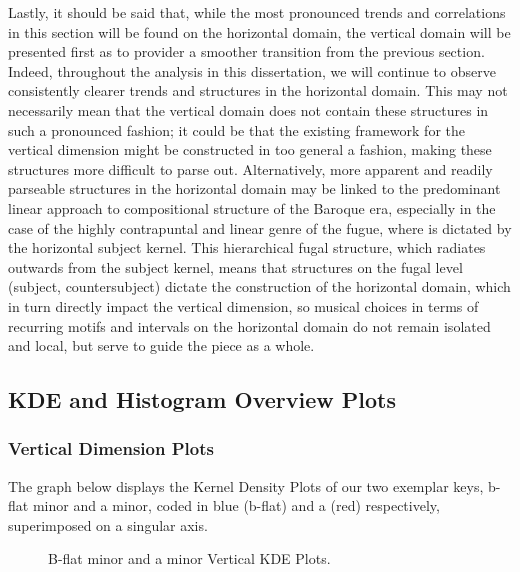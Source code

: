 Lastly, it should be said that, while the most pronounced trends and
correlations in this section will be found on the horizontal domain, the
vertical domain will be presented first as to provider a smoother
transition from the previous section. Indeed, throughout the analysis in
this dissertation, we will continue to observe consistently clearer
trends and structures in the horizontal domain. This may not necessarily
mean that the vertical domain does not contain these structures in such
a pronounced fashion; it could be that the existing framework for the
vertical dimension might be constructed in too general a fashion, making
these structures more difficult to parse out. Alternatively, more
apparent and readily parseable structures in the horizontal domain may
be linked to the predominant linear approach to compositional structure
of the Baroque era, especially in the case of the highly contrapuntal
and linear genre of the fugue, where is dictated by the horizontal
subject kernel. This hierarchical fugal structure, which radiates
outwards from the subject kernel, means that structures on the fugal
level (subject, countersubject) dictate the construction of the
horizontal domain, which in turn directly impact the vertical dimension,
so musical choices in terms of recurring motifs and intervals on the
horizontal domain do not remain isolated and local, but serve to guide
the piece as a whole.

    \subsection{KDE and Histogram Overview
Plots}\label{kde-and-histogram-overview-plots}

\subsubsection{Vertical Dimension Plots}\label{vertical-dimension-plots}

The graph below displays the Kernel Density Plots of our two exemplar
keys, b-flat minor and a minor, coded in blue (b-flat) and a (red)
respectively, superimposed on a singular axis.




\begin{figure}[H]
    \begin{center}
    \caption{B-flat minor and a minor Vertical KDE Plots.}
    \end{center}
\end{figure}
    
